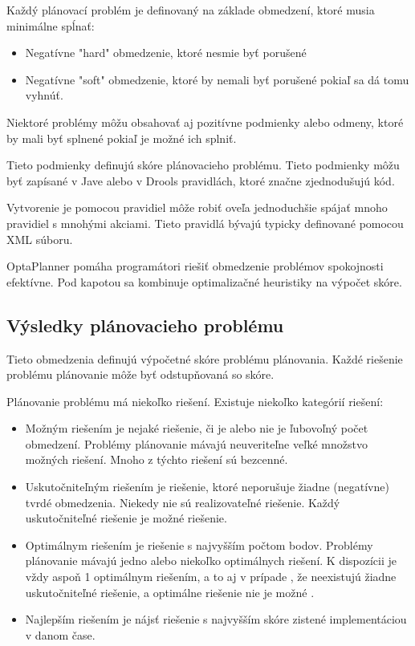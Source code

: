 Každý plánovací problém je definovaný na základe obmedzení, ktoré musia minimálne spĺnať: \cite{optabook}
\begin{itemize}
\item Negatívne "hard" obmedzenie, ktoré nesmie byť porušené
\item Negatívne "soft" obmedzenie, ktoré by nemali byť porušené pokiaľ sa dá tomu vyhnúť.
\end{itemize}

Niektoré problémy môžu obsahovať aj pozitívne podmienky alebo odmeny, ktoré by mali byť splnené pokiaľ je možné ich splniť.

Tieto podmienky definujú skóre plánovacieho problému. Tieto podmienky môžu byť zapísané v Jave alebo v Drools pravidlách, ktoré značne zjednodušujú kód.

 Vytvorenie je pomocou pravidiel  môže robiť  oveľa jednoduchšie spájať mnoho pravidiel s mnohými akciami. Tieto pravidlá bývajú typicky definované pomocou XML súboru.

OptaPlanner pomáha  programátori riešiť obmedzenie problémov spokojnosti efektívne. Pod kapotou sa kombinuje optimalizačné heuristiky na výpočet skóre.



\subsection{Výsledky plánovacieho problému}

Tieto obmedzenia definujú výpočetné skóre problému plánovania. Každé riešenie problému plánovanie môže byť odstupňovaná so skóre. 

Plánovanie problému má niekoľko riešení. Existuje niekoľko kategórií riešení:
\begin{itemize}
\item Možným riešením je nejaké riešenie, či je alebo nie je ľubovoľný počet obmedzení. Problémy plánovanie mávajú neuveriteľne veľké množstvo možných riešení. Mnoho z týchto riešení sú bezcenné.
\item Uskutočniteľným riešením je riešenie, ktoré neporušuje žiadne (negatívne) tvrdé obmedzenia. Niekedy nie sú realizovateľné riešenie. Každý uskutočniteľné riešenie je možné riešenie.

\item Optimálnym riešením je riešenie s najvyšším počtom bodov. Problémy plánovanie mávajú jedno alebo niekoľko optimálnych riešení. K dispozícii je vždy aspoň 1 optimálnym riešením, a to aj v prípade , že neexistujú žiadne uskutočniteľné riešenie, a optimálne riešenie nie je možné .
\item Najlepším riešením je nájsť riešenie s najvyšším skóre zistené implementáciou v danom čase.

\end{itemize}

